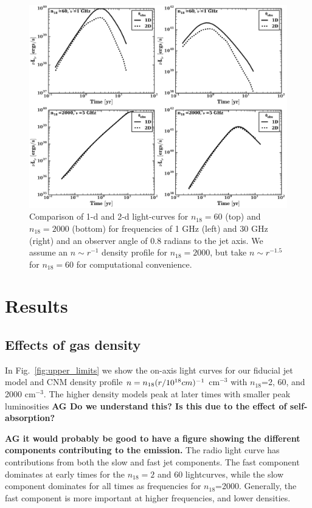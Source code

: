 \documentclass[usenatbib,fleqn]{mnras}
\begin{document}
\begin{figure}
\includegraphics[width=16cm]{1d_2d.pdf}
\caption{\label{fig:1d2dB} Comparison of 1-d and 2-d light-curves for
  $n_{18}=60$ (top) and $n_{18}=2000$ (bottom) for frequencies of 1
  GHz (left) and 30 GHz (right) and an observer angle of 0.8 radians
  to the jet axis. We assume an $n\sim r^{-1}$ density profile for
  $n_{18}=2000$, but take $n\sim r^{-1.5}$ for $n_{18}=60$ for
  computational convenience.}
\end{figure}


\section{Results}
\label{sec:results}

\subsection{Effects of gas density}

In Fig.~\ref{fig:upper_limits} we show the on-axis light curves for
our fiducial jet model and CNM density profile $n=n_{18} (r/10^{18}
{\rm} cm)^{-1}$ cm$^{-3}$ with $n_{18}$=2, 60, and 2000 cm$^{-3}$. The
higher density models peak at later times with smaller peak
luminosities {\bf AG Do we understand this? Is this due to the effect
  of self-absorption?}

{\bf AG it would probably be good to have a figure showing the
  different components contributing to the emission.} The radio light
curve has contributions from both the slow and fast jet
components. The fast component dominates at
early times for the $n_{18}=2$ and 60 lightcurves, while the slow
component dominates for all times as frequencies for
$n_{18}$=2000. Generally, the fast component is more important at
higher frequencies, and lower densities.
\end{document}
